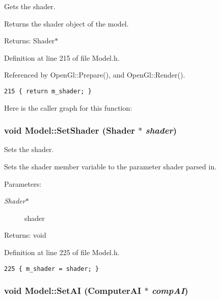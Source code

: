 Gets the shader. 

Returns the shader object of the model.

\begin{Desc}
\item[Returns:]Shader$\ast$ \end{Desc}


Definition at line 215 of file Model.h.

Referenced by OpenGl::Prepare(), and OpenGl::Render().

\begin{Code}\begin{verbatim}215 { return m_shader; }
\end{verbatim}
\end{Code}




Here is the caller graph for this function:\hypertarget{class_model_a1a4b42427c675bccfdd93d3b049cee5}{
\subsubsection[SetShader]{\setlength{\rightskip}{0pt plus 5cm}void Model::SetShader ({\bf Shader} $\ast$ {\em shader})}}
\label{class_model_a1a4b42427c675bccfdd93d3b049cee5}


Sets the shader. 

Sets the shader member variable to the parameter shader parsed in.

\begin{Desc}
\item[Parameters:]
\begin{description}
\item[{\em Shader$\ast$}]shader \end{description}
\end{Desc}
\begin{Desc}
\item[Returns:]void \end{Desc}


Definition at line 225 of file Model.h.

\begin{Code}\begin{verbatim}225 { m_shader = shader; }
\end{verbatim}
\end{Code}


\hypertarget{class_model_88a59a41b18480246ade2f6a22b4e61d}{
\subsubsection[SetAI]{\setlength{\rightskip}{0pt plus 5cm}void Model::SetAI (ComputerAI $\ast$ {\em compAI})}}
\label{class_model_88a59a41b18480246ade2f6a22b4e61d}


